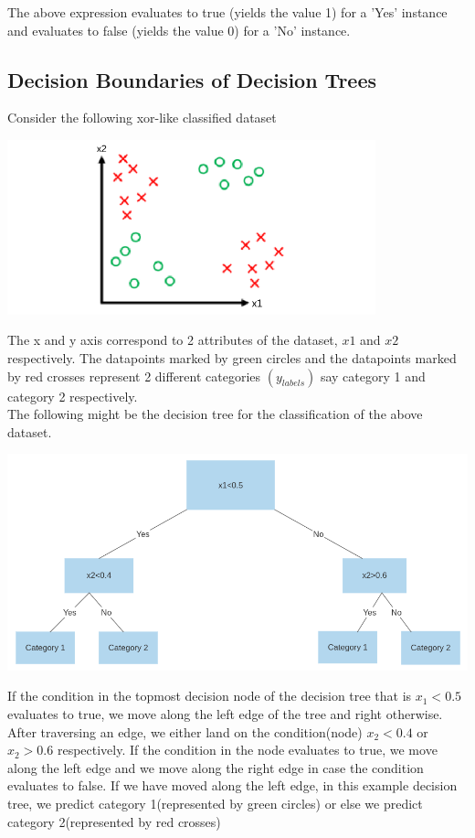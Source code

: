 The above expression evaluates to true (yields the value 1) for a 'Yes' instance and evaluates to false (yields the value 0) for a 'No' instance.

\subsection{Decision Boundaries of Decision Trees}
Consider the following xor-like classified dataset

\begin{center}
  \includegraphics[width=0.8\textwidth]{images/05_07.png}
\end{center}

The x and y axis correspond to 2 attributes of the dataset, $x1$ and $x2$ respectively. The datapoints marked by green circles and the datapoints marked by red crosses represent 2 different categories $(y_{labels})$ say category 1 and category 2 respectively. \\

The following might be the decision tree for the classification of the above dataset.
\begin{center}
  \includegraphics[width=\textwidth]{images/05_08.png}
\end{center}

If the condition in the topmost decision node of the decision tree that is $x_{1} < 0.5$ evaluates to true, we move along the left edge of the tree and right otherwise. After traversing an edge, we either land on the condition(node) $x_{2} < 0.4$ or $x_{2} > 0.6$ respectively. If the condition in the node evaluates to true, we move along the left edge and we move along the right edge in case the condition evaluates to false. If we have moved along the left edge, in this example decision tree, we predict category 1(represented by green circles) or else we predict category 2(represented by red crosses) \\

